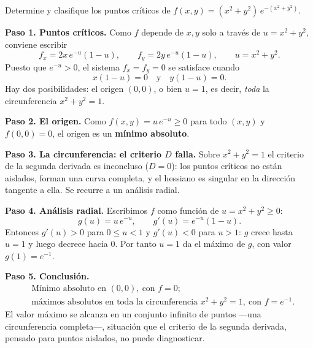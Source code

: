 \begin{prob}
Determine y clasifique los puntos críticos de
$f(x,y)=(x^2+y^2)\,e^{-(x^2+y^2)}$.
\begin{myproof}
\textbf{Paso 1. Puntos críticos.}
Como $f$ depende de $x,y$ solo a través de $u=x^2+y^2$, conviene escribir
\[
f_x=2x\,e^{-u}(1-u),\qquad f_y=2y\,e^{-u}(1-u),\qquad u=x^2+y^2.
\]
Puesto que $e^{-u}>0$, el sistema $f_x=f_y=0$ se satisface cuando
\[
x(1-u)=0\quad\text{y}\quad y(1-u)=0.
\]
Hay dos posibilidades: el origen $(0,0)$, o bien $u=1$, es decir, \emph{toda}
la circunferencia $x^2+y^2=1$.

\textbf{Paso 2. El origen.}
Como $f(x,y)=u\,e^{-u}\ge 0$ para todo $(x,y)$ y $f(0,0)=0$, el origen es un
\textbf{mínimo absoluto}.

\textbf{Paso 3. La circunferencia: el criterio $D$ falla.}
Sobre $x^2+y^2=1$ el criterio de la segunda derivada es inconcluso ($D=0$):
los puntos críticos no están aislados, forman una curva completa, y el
hessiano es singular en la dirección tangente a ella. Se recurre a un
análisis radial.

\textbf{Paso 4. Análisis radial.}
Escribimos $f$ como función de $u=x^2+y^2\ge 0$:
\[
g(u)=u\,e^{-u},\qquad g'(u)=e^{-u}(1-u).
\]
Entonces $g'(u)>0$ para $0\le u<1$ y $g'(u)<0$ para $u>1$: $g$ crece hasta
$u=1$ y luego decrece hacia $0$. Por tanto $u=1$ da el máximo de $g$, con
valor $g(1)=e^{-1}$.

\textbf{Paso 5. Conclusión.}
\[
\boxed{\;
\begin{aligned}
&\text{Mínimo absoluto en }(0,0),\ \text{con }f=0;\\
&\text{máximos absolutos en toda la circunferencia }x^2+y^2=1,\ \text{con }f=e^{-1}.
\end{aligned}\;}
\]
El valor máximo se alcanza en un conjunto infinito de puntos —una
circunferencia completa—, situación que el criterio de la segunda derivada,
pensado para puntos aislados, no puede diagnosticar.
\end{myproof}
\end{prob}

